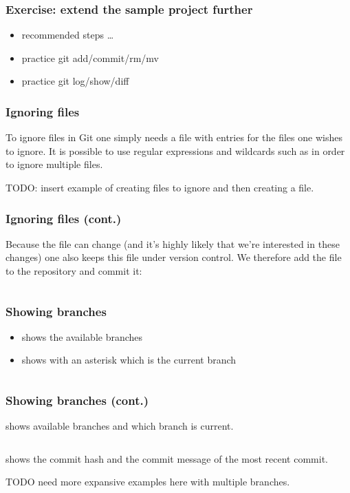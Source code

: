 \begin{frame}
\frametitle{Exercise: extend the sample project further}
\begin{itemize}
    \item recommended steps \ldots
    \item practice git add/commit/rm/mv
    \item practice git log/show/diff
\end{itemize}
\end{frame}

\begin{frame}
\frametitle{Ignoring files}

To ignore files in Git one simply needs a  file with
entries for the files one wishes to ignore. It is possible to use
regular expressions and wildcards such as  in order to ignore
multiple files.

TODO: insert example of creating files to ignore and then creating a
 file.
\end{frame}

\begin{frame}[fragile]
\frametitle{Ignoring files (cont.)}

Because the  file can change (and it’s highly likely
that we’re interested in these changes) one also keeps this file under
version control. We therefore add the file to the repository and commit
it:

    \inputminted{bash}{add-gitignore.txt}
\end{frame}

\begin{frame}[fragile]
\frametitle{Showing branches}

\begin{itemize}
    \item shows the available branches
    \item shows with an asterisk \code{*} which is the current branch
\end{itemize}

    \inputminted{bash}{git-show-branch-output.txt}
\end{frame}

\begin{frame}[fragile]
\frametitle{Showing branches (cont.)}
 shows available branches and which branch is
current.

    \inputminted{bash}{git-branch-output.txt}

 shows the commit hash and the commit
message of the most recent commit.

TODO need more expansive examples here with multiple branches.

    \inputminted{bash}{git-branch-v-output.txt}
\end{frame}

